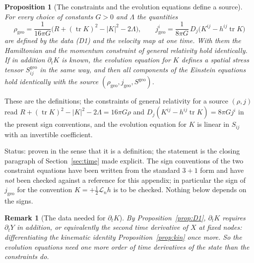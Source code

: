 \documentclass[11pt,a4paper]{article}
\makeatletter
\theoremstyle{stmt}
\newtheorem{proposition}[theorem]{Proposition}
\theoremstyle{defn}
\theoremstyle{rmk}
\newtheorem{remark}[theorem]{Remark}
\renewenvironment{proof}[1][\proofname]{\par\pushQED{\qed}\normalfont\topsep6\p@\@plus6\p@\relax
  \trivlist\item[\hskip\labelsep{\sffamily\itshape\small #1.}]\ignorespaces}{\popQED\endtrivlist\@endpefalse}
\numberwithin{equation}{section}
\DeclareMathOperator{\tr}{tr}
\newcommand{\Lie}{\mathcal{L}}
\newcommand{\status}[1]{\par\noindent\textsf{\small Status: #1}\par}
\makeatother
\begin{document}
{\begin{proposition}[The constraints and the evolution equations define a source]\label{prop:source}
For every choice of constants $G>0$ and $\Lambda$ the quantities
\[
\rho_{\mathrm{geo}}=\frac{1}{16\pi G}\big(R+(\tr K)^2-|K|^2-2\Lambda\big),\qquad
j^i_{\mathrm{geo}}=\frac{1}{8\pi G}\,D_j\big(K^{ij}-h^{ij}\tr K\big)
\]
are defined by the data \textup{(D1)} and the velocity map at one time. With them the Hamiltonian and the momentum constraint of general relativity hold identically. If in addition $\partial_tK$ is known, the evolution equation for $K$ defines a spatial stress tensor $S^{\mathrm{geo}}_{ij}$ in the same way, and then all components of the Einstein equations hold identically with the source $(\rho_{\mathrm{geo}},j_{\mathrm{geo}},S^{\mathrm{geo}})$.
\end{proposition}

\begin{proof}
These are the definitions; the constraints of general relativity for a source $(\rho,j)$ read $R+(\tr K)^2-|K|^2-2\Lambda=16\pi G\rho$ and $D_j(K^{ij}-h^{ij}\tr K)=8\pi Gj^i$ in the present sign conventions, and the evolution equation for $K$ is linear in $S_{ij}$ with an invertible coefficient.
\end{proof}
\status{proven in the sense that it is a definition; the statement is the closing paragraph of Section~\ref{sec:time} made explicit. The sign conventions of the two constraint equations have been written from the standard $3+1$ form and have \emph{not} been checked against a reference for this appendix; in particular the sign of $j_{\mathrm{geo}}$ for the convention $K=+\tfrac12\Lie_nh$ is to be checked. Nothing below depends on the signs.}

\begin{remark}[The data needed for $\partial_tK$]
By Proposition~\ref{prop:D1}, $\partial_tK$ requires $\partial_tY$ in addition, or equivalently the second time derivative of $X$ at fixed nodes: differentiating the kinematic identity Proposition~\ref{prop:kin} once more. So the evolution equations need one more order of time derivatives of the state than the constraints do.
\end{remark}

}
\end{document}
